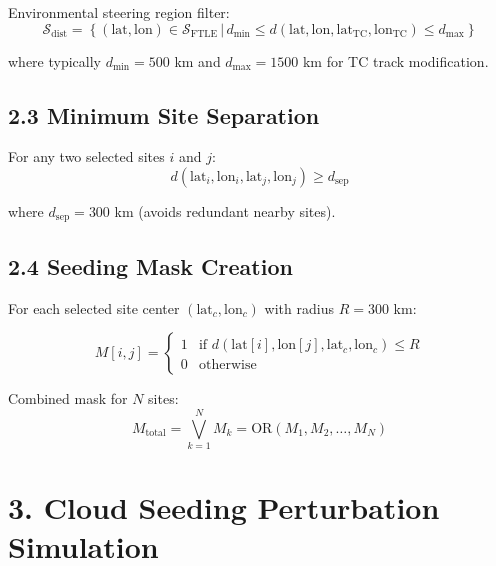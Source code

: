\documentclass{article}
\begin{document}
Environmental steering region filter:
\begin{equation}
\mathcal{S}_{\text{dist}} = \left\{ (\text{lat}, \text{lon}) \in \mathcal{S}_{\text{FTLE}} \,|\, d_{\min} \leq d(\text{lat}, \text{lon}, \text{lat}_{\text{TC}}, \text{lon}_{\text{TC}}) \leq d_{\max} \right\}
\end{equation}

where typically $d_{\min} = 500$ km and $d_{\max} = 1500$ km for TC track modification.

\subsection*{2.3 Minimum Site Separation}

For any two selected sites $i$ and $j$:
\begin{equation}
d(\text{lat}_i, \text{lon}_i, \text{lat}_j, \text{lon}_j) \geq d_{\text{sep}}
\end{equation}

where $d_{\text{sep}} = 300$ km (avoids redundant nearby sites).

\subsection*{2.4 Seeding Mask Creation}

For each selected site center $(\text{lat}_c, \text{lon}_c)$ with radius $R = 300$ km:

\begin{equation}
M[i,j] =
\begin{cases}
1 & \text{if } d(\text{lat}[i], \text{lon}[j], \text{lat}_c, \text{lon}_c) \leq R \\
0 & \text{otherwise}
\end{cases}
\end{equation}

Combined mask for $N$ sites:
\begin{equation}
\boxed{
M_{\text{total}} = \bigvee_{k=1}^{N} M_k = \text{OR}(M_1, M_2, \ldots, M_N)
}
\end{equation}


\section*{3. Cloud Seeding Perturbation Simulation}
\end{document}
